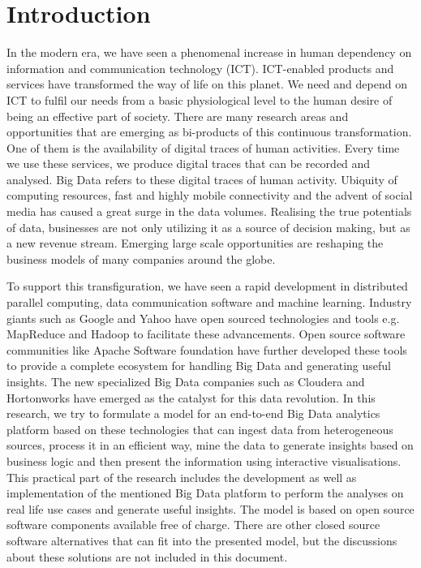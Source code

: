 \setcounter{page}{1}
\chapter{Introduction}
\label{chapter:intro}

 In the modern era, we have seen a phenomenal increase in human dependency on information and communication technology (ICT). ICT-enabled products and services have transformed the way of life on this planet. We need and depend on ICT to fulfil our needs from a basic physiological level to the human desire of being an effective part of society. There are many research areas and opportunities that are emerging as bi-products of this continuous transformation. One of them is the availability of digital traces of human activities. Every time we use these services, we produce digital traces that can be recorded and analysed. Big Data refers to these digital traces of human activity. Ubiquity of computing resources, fast and highly mobile connectivity and the advent of social media has caused a great surge in the data volumes. Realising the true potentials of data, businesses are not only utilizing it as a source of decision making, but as a new revenue stream. Emerging large scale opportunities are reshaping the business models of many companies around the globe.
 
To support this transfiguration, we have seen a rapid development in distributed parallel computing, data communication software and machine learning. Industry giants such as Google and Yahoo have open sourced technologies and tools e.g. MapReduce and Hadoop to facilitate these advancements. Open source software communities like Apache Software foundation have further developed these tools to provide a complete ecosystem for handling Big Data and generating useful insights. The new specialized Big Data companies such as Cloudera and Hortonworks have emerged as the catalyst for this data revolution. In this research, we try to formulate a model for an end-to-end Big Data analytics platform based on these technologies that can ingest data from heterogeneous sources, process it in an efficient way, mine the data to generate insights based on business logic and then present the information using interactive visualisations. This practical part of the research includes the development as well as implementation of the mentioned Big Data platform to perform the analyses on real life use cases and generate useful insights. The model is based on open source software components available free of charge. There are other closed source software alternatives that can fit into the presented model, but the discussions about these solutions are not included in this document.

